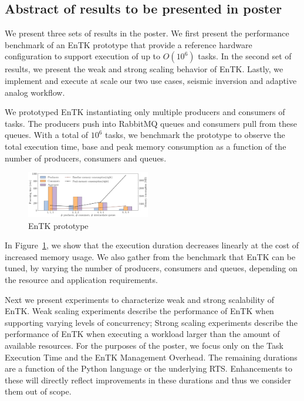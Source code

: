 \subsection{Abstract of results to be presented in poster}

We present three sets of results in the poster. We first present the performance
benchmark of an EnTK prototype that provide a reference hardware configuration 
to support execution of up to $O(10^6)$ tasks. In the second set of results, we
present the weak and strong scaling behavior of EnTK. Lastly, we implement and 
execute at scale our two use cases, seismic inversion and adaptive analog 
workflow.

We prototyped EnTK instantiating only multiple producers and consumers of tasks.
The producers push into RabbitMQ queues and consumers pull from these queues.
With a total of $10^6$ tasks, we benchmark the prototype to observe the total
execution time, base and peak memory consumption as a function of the number of
producers, consumers and queues.

\begin{figure} 
\includegraphics[width=0.48\textwidth]{figs/prototype.pdf}
\caption{EnTK prototype}\label{fig:prototype}
\end{figure}

In Figure~\ref{fig:prototype}, we show that the execution duration decreases
linearly at the cost of increased memory usage. We also gather from the 
benchmark that EnTK can be tuned, by varying the number of producers, consumers 
and queues, depending on the resource and application requirements.


Next we present experiments to characterize weak and strong scalability of EnTK.
Weak scaling experiments describe the performance of EnTK when supporting 
varying levels of concurrency; Strong scaling experiments describe the 
performance of EnTK when executing a workload larger than the amount of 
available resources. For the purposes of the poster, we focus only on the Task
Execution Time and the EnTK Management Overhead. The remaining durations are
a function of the Python language or the underlying RTS. Enhancements to these
will directly reflect improvements in these durations and thus we consider them
out of scope.

